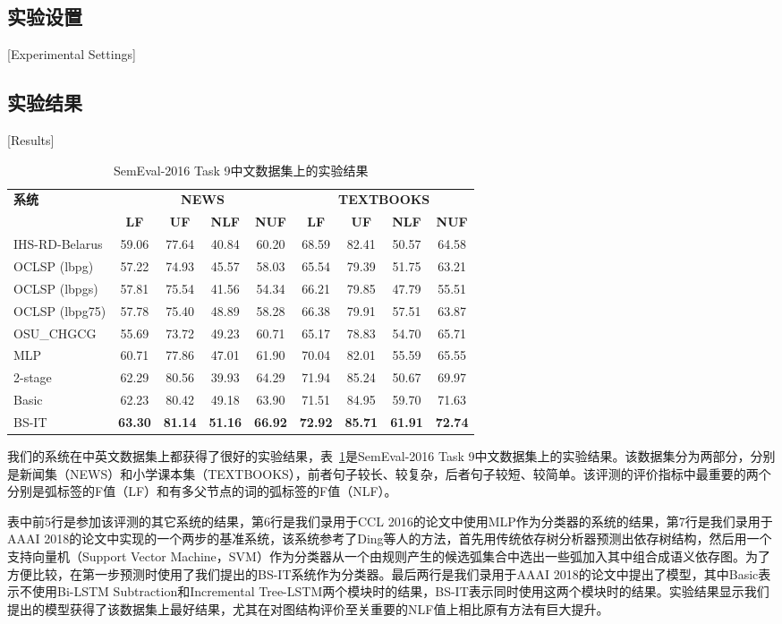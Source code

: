 \subsection{实验设置}[Experimental Settings]


\subsection{实验结果}[Results]


\begin{table}[htpb]
	\centering
	\small
	\renewcommand{\arraystretch}{1.2}
	\begin{tabular}{l||cc|cc||cc|cc}
		\hline
		\multirow{2}{*}{\bf 系统}&\multicolumn{4}{c}{\bf NEWS}&\multicolumn{4}{c}{\bf TEXTBOOKS}\\
		\cline{2-9}
		&\bf LF&\bf UF&\bf NLF&\bf NUF&\bf LF&\bf UF&\bf NLF&\bf NUF\\
		\hline
		IHS-RD-Belarus&59.06&77.64&40.84&60.20&68.59&82.41&50.57&64.58\\
		OCLSP (lbpg)&57.22&74.93&45.57&58.03&65.54&79.39&51.75&63.21\\
		OCLSP (lbpgs)&57.81&75.54&41.56&54.34&66.21&79.85&47.79&55.51\\
		OCLSP (lbpg75)&57.78&75.40&48.89&58.28&66.38&79.91&57.51&63.87\\
		OSU\_CHGCG&55.69&73.72&49.23&60.71&65.17&78.83&54.70&65.71\\
		\hline
		MLP & 60.71&77.86&47.01&61.90&70.04&82.01&55.59&65.55 \\ 
		\hline
		2-stage & 62.29&80.56&39.93&64.29&71.94&85.24&50.67&69.97 \\ 
		\hline
		Basic&62.23&80.42&49.18&63.90&71.51&84.95&59.70&71.63\\
		BS-IT&\bf63.30&\bf81.14&\bf51.16&\bf66.92&\bf72.92&\bf85.71&\bf61.91&\bf72.74\\
		\hline
	\end{tabular}
	\caption{SemEval-2016 Task 9中文数据集上的实验结果}
	\label{tbl:result-semeval16}
\end{table}

我们的系统在中英文数据集上都获得了很好的实验结果，表~\ref{tbl:result-semeval16}是SemEval-2016 Task 9中文数据集上的实验结果。该数据集分为两部分，分别是新闻集（NEWS）和小学课本集（TEXTBOOKS），前者句子较长、较复杂，后者句子较短、较简单。该评测的评价指标中最重要的两个分别是弧标签的F值（LF）和有多父节点的词的弧标签的F值（NLF）。

表中前5行是参加该评测的其它系统的结果，第6行是我们录用于CCL 2016的论文中使用MLP作为分类器的系统的结果，第7行是我们录用于AAAI 2018的论文中实现的一个两步的基准系统，该系统参考了Ding等人的方法，\cite{ding2014chinese}首先用传统依存树分析器预测出依存树结构，然后用一个支持向量机（Support Vector Machine，SVM）作为分类器从一个由规则产生的候选弧集合中选出一些弧加入其中组合成语义依存图。为了方便比较，在第一步预测时使用了我们提出的BS-IT系统作为分类器。最后两行是我们录用于AAAI 2018的论文中提出了模型，其中Basic表示不使用Bi-LSTM Subtraction和Incremental Tree-LSTM两个模块时的结果，BS-IT表示同时使用这两个模块时的结果。实验结果显示我们提出的模型获得了该数据集上最好结果，尤其在对图结构评价至关重要的NLF值上相比原有方法有巨大提升。

